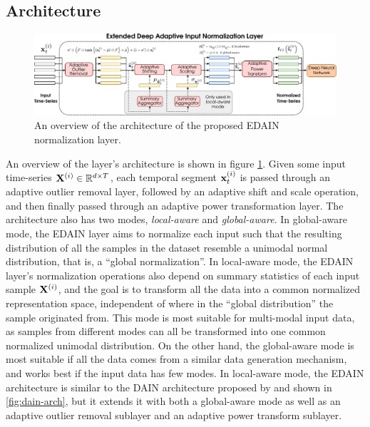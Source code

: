 \documentclass{statsmsc}
\begin{document}
{\subsection{Architecture}%
\label{sub:edain_arch}

\begin{figure}
\begin{center}
    \includegraphics[width=\textwidth]{diagrams/edain-diagram.pdf}
\end{center}
\caption{An overview of the architecture of the proposed \ac{EDAIN} normalization layer.}
\label{fig:edain-arch}
\end{figure}

An overview of the layer's architecture is shown in figure \cref{fig:edain-arch}.
Given some input time-series $\mathbf{X}^{(i)} \in \mathbb{R}^{d \times T}$, each temporal segment
$\mathbf{x}^{(i)}_t$ is passed through an adaptive outlier removal layer, followed by an adaptive shift
and scale operation, and then finally passed through an adaptive power transformation layer.
The architecture also has two modes, \textit{local-aware} and \textit{global-aware}. In
global-aware mode, the \ac{EDAIN} layer aims to normalize each input such that the resulting
distribution of all the samples in the dataset resemble a unimodal normal distribution, that is,
a ``global normalization''. In local-aware mode,
the \ac{EDAIN} layer's normalization operations
also depend on summary statistics of each input sample $\mathbf{X}^{(i)}$, and the goal is to transform
all the data into a common normalized representation space, independent of where in the
``global distribution'' the sample originated from. This mode is most suitable for
multi-modal input data, as samples from different modes can all be transformed into one common
normalized unimodal distribution. On the other hand, the global-aware mode
is most suitable if all the data comes from a similar data generation mechanism,
and works best if the input data has few modes.
In local-aware mode, the \ac{EDAIN} architecture is similar to the
\ac{DAIN} architecture proposed by \citeauthor{dain} and shown
in \cref{fig:dain-arch}, but it
extends it with both a global-aware mode as well as an adaptive outlier removal sublayer and
an adaptive power transform sublayer.

}
\end{document}
